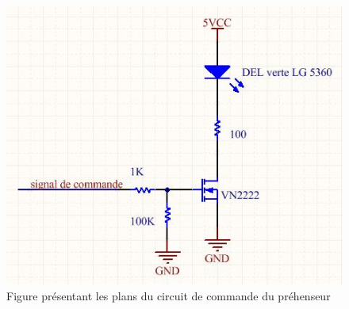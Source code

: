 \begin{figure}[htbp]
\centering
\includegraphics[scale=0.5]{fig/del_verte.jpg}
\caption{Figure présentant les plans du circuit de commande du préhenseur}
\label{fig:del_verte}
\end{figure}